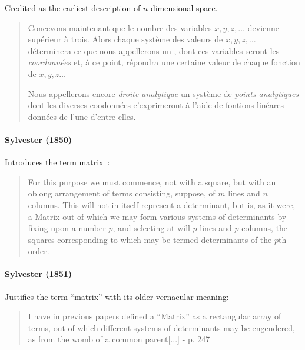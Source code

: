 Credited  as the earliest description of $n$-dimensional space.

\begin{quote}
Concevons maintenant que le nombre des variables $x, y, z, \dots$
devienne sup\'erieur \`a trois. Alors chaque syst\`eme des valeurs de
$x, y, z, \dots$ d\'eterminera ce que nous appellerons un , dont
ces variables seront les \textit{coordonn\'ees} et, \`a ce point, r\'epondra une
certaine valeur de chaque fonction de $x, y, z \dots$

Nous appellerons encore \textit{droite analytique} un syst\`eme de \textit{points
analytiques} dont les diverses coodonn\'ees e'exprimeront \`a l'aide de
fontions lin\'eares donn\'ees de l'une d'entre elles.
\end{quote}



\paragraph{Sylvester (1850)~\cite{Sylvester1850}}

Introduces the term matrix~\cite[p. 150]{Sylvester1850}:

\begin{quote}
For this purpose we must commence, not with a square, but with an oblong arrangement
of terms consisting, suppose,
of $m$ lines and $n$ columns. This will not in itself represent a determinant,
but is, as it were, a Matrix out of which we may form various systems of
determinants by fixing upon a number $p$, and selecting at will $p$ lines and $p$
columns, the squares corresponding to which may be termed determinants
of the $p$th order.
\end{quote}



\paragraph{Sylvester (1851)~\cite{Sylvester1851}}

Justifies the term ``matrix'' with its older vernacular meaning:

\begin{quote}
I have in previous papers defined a ``Matrix'' as a rectangular array of
terms, out of which different systems of determinants may be engendered,
as from the womb of a common parent[...] - p. 247
\end{quote}




